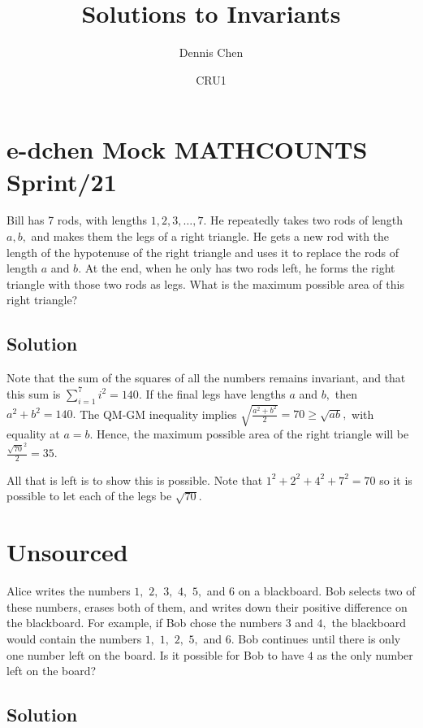 \documentclass[mast]{lucky}
\title{Solutions to Invariants}
\author{Dennis Chen}
\date{CRU1}
\begin{document}
\maketitle

\toc

\pagebreak\section{e-dchen Mock MATHCOUNTS Sprint/21}

Bill has 7 rods, with lengths $1,2,3,\dots,7.$ He repeatedly takes two rods of length $a,b,$ and makes them the legs of a right triangle. He gets a new rod with the length of the hypotenuse of the right triangle and uses it to replace the rods of length $a$ and $b.$ At the end, when he only has two rods left, he forms the right triangle with those two rods as legs. What is the maximum possible area of this right triangle?

\subsection{Solution}

Note that the sum of the squares of all the numbers remains invariant, and that this sum is $\displaystyle \sum_{i=1}^7 i^2 = 140$. If the final legs have lengths $a$ and $b,$ then $a^2+b^2=140.$ The QM-GM inequality implies $\sqrt{\frac{a^2+b^2}{2}}=70 \ge \sqrt{ab},$ with equality at $a=b$. Hence, the maximum possible area of the right triangle will be $\frac{\sqrt{70}^2}{2} = 35.$

All that is left is to show this is possible. Note that $1^2 + 2^2 + 4^2 + 7^2 = 70$ so it is possible to let each of the legs be $\sqrt{70}.$

\pagebreak\section{Unsourced}

Alice writes the numbers $1,$ $2,$ $3,$ $4,$ $5,$ and $6$ on a blackboard. Bob selects two of these numbers, erases both of them, and writes down their positive difference on the blackboard. For example, if Bob chose the numbers $3$ and $4,$ the blackboard would contain the numbers $1,$ $1,$ $2,$ $5,$ and $6.$ Bob continues until there is only one number left on the board. Is it possible for Bob to have $4$ as the only number left on the board?

\subsection{Solution}
\end{document}
